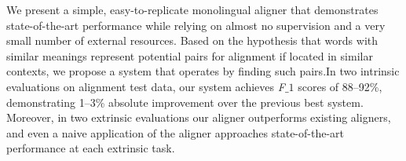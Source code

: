 We present a simple, easy-to-replicate monolingual aligner that demonstrates state-of-the-art performance while relying on almost no supervision and a very small number of external resources. Based on the hypothesis that words with similar meanings represent potential pairs for alignment if located in similar contexts, we propose a system that operates by finding such pairs.In two intrinsic evaluations on alignment test data, our system achieves \textit{F}$\_{1}$ scores of 88--92\%, demonstrating 1--3\% absolute improvement over the previous best system. Moreover, in two extrinsic evaluations our aligner outperforms existing aligners, and even a naive application of the aligner approaches state-of-the-art performance at each extrinsic task.
